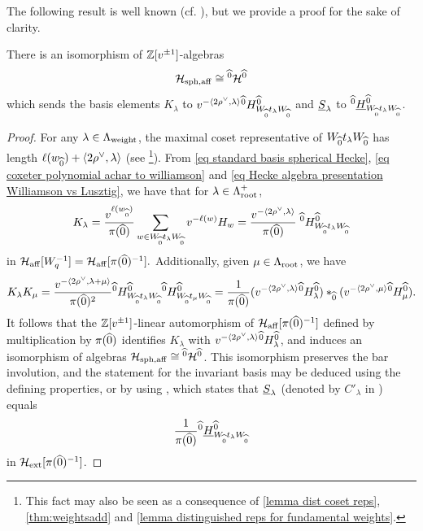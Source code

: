 The following result is well known (cf. \cite[Remark 2.2.2 (3)]{WillThesis}), but we provide a proof for the sake of clarity.

\begin{lemma}\label{lemma affine spherical Hecke in Hecke algebroid}
 There is an isomorphism of $\mathbb{Z}[v^{\pm 1}]$-algebras   
 $$\mathcal{H}_{\operatorname{sph}, \operatorname{aff}} \cong {}^{\widehat{0}}\mathcal{H}^{\widehat{0}}$$
 which sends the basis elements $K_\lambda$ to $v^{-\langle2\rho^\vee, \lambda \rangle}{}^{\widehat{0}}H^{\widehat{0}}_{W_{\widehat{0}}t_{\lambda}W_{\widehat{0}}}$ and $\underline{S}_\lambda$ to ${}^{\widehat{0}}\underline{H}^{\widehat{0}}_{W_{\widehat{0}}t_{\lambda}W_{\widehat{0}}}$.
\end{lemma}
\begin{proof}
For any $\lambda \in \Lambda_{\operatorname{weight}}$, the maximal coset representative of $W_{\widehat{0}}t_\lambda W_{\widehat{0}}$ has length $\ell(w_{\widehat{0}}) + \langle 2\rho^\vee, \lambda \rangle$ (see \cite[Chapter 2]{Macdonaldhecke}\footnote{This fact may also be seen as a consequence of \cref{lemma dist coset reps}, \cref{thm:weightsadd} and \cref{lemma distinguished reps for fundamental weights}.}).
From \cref{eq standard basis spherical Hecke}, \cref{eq coxeter polynomial achar to williamson} and \cref{eq Hecke algebra presentation Williamson vs Lusztig},
we have that for $\lambda \in \Lambda_{\operatorname{root}}^+$,
$$K_\lambda= \frac{v^{\ell(w_{\widehat{0}})}}{\pi(\widehat{0})} \sum_{w\in W_{\widehat{0}}t_\lambda W_{\widehat{0}}}v^{-\ell(w)}H_w= \frac{v^{-\langle2 \rho^\vee, \lambda \rangle}}{\pi(\widehat{0})}\; {}^{\widehat{0}}H^{\widehat{0}}_{W_{\widehat{0}}t_\lambda W_{\widehat{0}}}$$
in $\mathcal{H}_{\operatorname{aff}}[W_q^{-1}]=\mathcal{H}_{\operatorname{aff}}[\pi(\widehat{0})^{-1}].$
Additionally, given $\mu \in \Lambda_{\operatorname{root}}$, we have
$$K_\lambda K_\mu
=\frac{v^{-\langle 2 \rho^\vee, \lambda+\mu \rangle}}{\pi(\widehat{0})^2} {}^{\widehat{0}}H^{\widehat{0}}_{W_{\widehat{0}}t_\lambda W_{\widehat{0}}} {}^{\widehat{0}}H^{\widehat{0}}_{W_{\widehat{0}}t_\mu W_{\widehat{0}}}
=\frac{1}{\pi(\widehat{0})}(v^{-\langle 2\rho^\vee, \lambda \rangle} {}^{\widehat{0}}H^{\widehat{0}}_{\lambda})
\ast_{\widehat{0}}(v^{-\langle 2\rho^\vee, \mu \rangle} {}^{\widehat{0}}H^{\widehat{0}}_{\mu}).$$
It follows that the $\mathbb{Z}[v^{\pm 1}]$-linear automorphism of $\mathcal{H}_{\operatorname{aff}}[\pi(\widehat{0})^{-1}]$ defined by multiplication by $\pi(\widehat{0})$ identifies  $K_\lambda$ with $v^{-\langle 2\rho^\vee, \lambda \rangle} {}^{\widehat{0}}H^{\widehat{0}}_{\lambda}$, and induces an isomorphism of algebras $\mathcal{H}_{\operatorname{sph}, \operatorname{aff}} \cong {}^{\widehat{0}}\mathcal{H}^{\widehat{0}}$.
This isomorphism preserves the bar involution, and the statement for the invariant basis may be deduced using the defining properties, or by using \cite[Theorem 6.12]{LusztigGS}, which states that
$\underline{S}_\lambda$ (denoted by $C'_\lambda$ in \cite{LusztigGS}) equals 
$$\frac{1}{\pi(\widehat{0})}{}^{\widehat{0}}\underline{H}^{\widehat{0}}_{W_{\widehat{0}}t_\lambda W_{\widehat{0}}}$$
in $\mathcal{H}_{\operatorname{ext}}[\pi(\widehat{0})^{-1}]$.
\end{proof}

